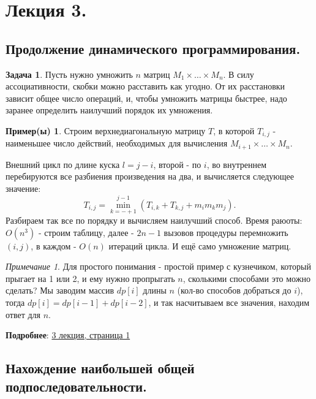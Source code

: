 \documentclass[a4paper]{article}
\theoremstyle{indented}
\theoremstyle{definition}
\newtheorem{exl}{Пример(ы)}
\newtheorem{prob}{Задача}
\theoremstyle{remark}
\newtheorem{remark}{Примечание}
\begin{document}
\section{Лекция 3.}

\subsection{Продолжение динамического программирования.}

\begin{prob}
    Пусть нужно умножить $n$ матриц $M_1 \times \ldots \times M_n$. В силу ассоциативности, скобки можно расставить как угодно. От их расстановки зависит общее число операций, и, чтобы умножить матрицы быстрее, надо заранее определить наилучший порядок их умножения.
\end{prob}

\begin{exl}
    Строим верхнедиагональную матрицу $T$, в которой $T_{i, j}$ - наименьшее число действий, необходимых для вычисления $M_{i+1} \times \ldots \times M_n$. \ 

    Внешний цикл по длине куска $l=j-i$, второй - по $i$, во внутреннем перебируются все разбиения произведения на два, и вычисляется следующее значение:
    \[
        T_{i, j}=\min_{k=-+1}^{j-1}(T_{i, k}+T_{k, j}+m_im_km_j). 
    \]
    Разбираем так все по порядку и вычисляем наилучший способ. Время раюоты: $O(n^3)$ - строим таблицу, далее - $2n-1$ вызовов процедуры перемножить $(i, j)$, в каждом - $O(n)$ итераций цикла. И ещё само умножение матриц.
\end{exl}

\begin{remark}
    Для простого понимания - простой пример с кузнечиком, который прыгает на 1 или 2, и ему нужно пропрыгать $n$, сколькими способами это можно сделать? Мы заводим массив $dp[i]$ длины $n$ (кол-во способов добраться до $i$), тогда $dp[i]=dp[i-1]+dp[i-2]$, и так насчитываем все значения, находим ответ для $n$. 
\end{remark}

\textbf{Подробнее}: \href{https://users.math-cs.spbu.ru/~okhotin/teaching/algorithms_2020/okhotin_algorithms_2020_l3.pdf}{3 лекция, страница 1}

\subsection{Нахождение наибольшей общей подпоследовательности.}
\end{document}
